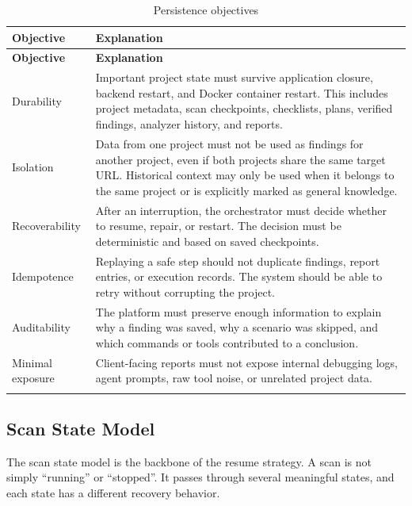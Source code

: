 \documentclass[12pt,a4paper]{report}
\begin{document}
\begin{longtable}{|p{}|p{}|}
\hline
\textbf{Objective} & \textbf{Explanation} \\
\hline
\endfirsthead
\hline
\textbf{Objective} & \textbf{Explanation} \\
\hline
\endhead
Durability & Important project state must survive application closure, backend restart,
and Docker container restart. This includes project metadata, scan checkpoints,
checklists, plans, verified findings, analyzer history, and reports. \\
\hline
Isolation & Data from one project must not be used as findings for another project,
even if both projects share the same target URL. Historical context may only be used
when it belongs to the same project or is explicitly marked as general knowledge. \\
\hline
Recoverability & After an interruption, the orchestrator must decide whether to resume,
repair, or restart. The decision must be deterministic and based on saved checkpoints. \\
\hline
Idempotence & Replaying a safe step should not duplicate findings, report entries, or
execution records. The system should be able to retry without corrupting the project. \\
\hline
Auditability & The platform must preserve enough information to explain why a finding
was saved, why a scenario was skipped, and which commands or tools contributed to a
conclusion. \\
\hline
Minimal exposure & Client-facing reports must not expose internal debugging logs,
agent prompts, raw tool noise, or unrelated project data. \\
\hline
\caption{Persistence objectives}
\label{tab:persistence_objectives}
\end{longtable}

\subsection{Scan State Model}

The scan state model is the backbone of the resume strategy. A scan is not simply
``running'' or ``stopped''. It passes through several meaningful states, and each state
has a different recovery behavior.
\end{document}
